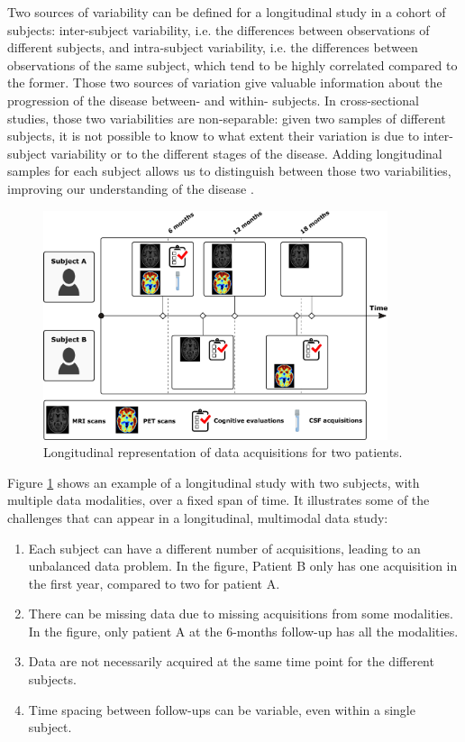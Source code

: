 Two sources of variability can be defined for a longitudinal study in a cohort of subjects: inter-subject variability, i.e. the differences between observations of different subjects, and intra-subject variability, i.e. the differences between observations of the same subject, which tend to be highly correlated compared to the former. Those two sources of variation give valuable information about the progression of the disease between- and within- subjects. In cross-sectional studies, those two variabilities are non-separable: given two samples of different subjects, it is not possible to know to what extent their variation is due to inter-subject variability or to the different stages of the disease. Adding longitudinal samples for each subject allows us to distinguish between those two variabilities, improving our understanding of the disease \cite{Fitzmaurice2008}. \\

\begin{figure}[htbp]
  \centering
  \includegraphics[width=0.9\textwidth]{figures/introduction/Fig-progression.pdf}
  \caption{Longitudinal representation of data acquisitions for two patients.}
  \label{long}
\end{figure}

Figure \ref{long} shows an example of a longitudinal study with two subjects, with multiple data modalities, over a fixed span of time. It illustrates some of the challenges that can appear in a longitudinal, multimodal data study: \\

\begin{enumerate}
\item Each subject can have a different number of acquisitions, leading to an unbalanced data problem. In the figure, Patient B only has one acquisition in the first year, compared to two for patient A.
\item There can be missing data due to missing acquisitions from some modalities. In the figure, only patient A at the 6-months follow-up has all the modalities.
\item Data are not necessarily acquired at the same time point for the different subjects.
\item Time spacing between follow-ups can be variable, even within a single subject.
\end{enumerate}

